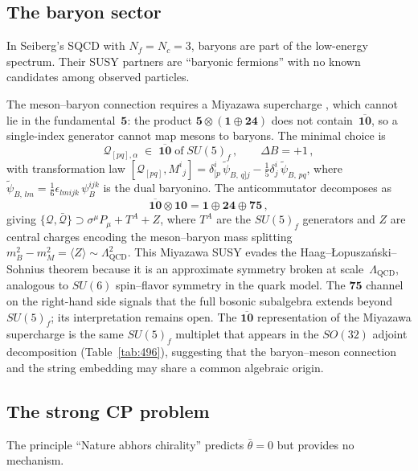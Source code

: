 \documentclass[12pt,a4paper]{article}
\begin{document}
\subsection{The baryon sector}
\label{subsec:baryon_open}
In Seiberg's SQCD with $N_f = N_c = 3$, baryons are part of the
low-energy spectrum. Their SUSY partners are ``baryonic fermions''
with no known candidates among observed particles.

The meson--baryon connection requires a Miyazawa supercharge
\cite{Miyazawa, CattoGursey}, which cannot lie in the
fundamental~$\mathbf{5}$: the product
$\mathbf{5}\otimes(\mathbf{1}\oplus\mathbf{24})$ does not
contain~$\overline{\mathbf{10}}$, so a single-index generator
cannot map mesons to baryons.  The minimal choice is
\begin{equation*}
\mathcal{Q}_{[pq],\alpha}
  \;\in\; \overline{\mathbf{10}}\;\text{of}\;SU(5)_f\,,
  \qquad \Delta B = +1\,,
\end{equation*}
with transformation law
$[\mathcal{Q}_{[pq]}, M^i{}_j]
  = \delta^i_{[p}\,\tilde\psi_{B,\,q]j}
  - \tfrac{1}{5}\delta^i_j\,\tilde\psi_{B,\,pq}$,
where $\tilde\psi_{B,\,lm}
  = \tfrac{1}{6}\epsilon_{lmijk}\,\psi_B^{ijk}$ is the dual
baryonino.  The anticommutator decomposes as
\begin{equation*}
\overline{\mathbf{10}}\otimes\mathbf{10}
  = \mathbf{1}\oplus\mathbf{24}\oplus\mathbf{75}\,,
\end{equation*}
giving $\{\mathcal{Q},\bar{\mathcal{Q}}\}
  \supset \sigma^\mu P_\mu + T^A + Z$, where $T^A$ are the
$SU(5)_f$ generators and $Z$ are central charges encoding the
meson--baryon mass splitting $m_B^2 - m_M^2 = \langle Z\rangle
\sim\Lambda_{\text{QCD}}^2$.  This Miyazawa SUSY evades the
Haag--\L{}opusza\'nski--Sohnius theorem because it is an
approximate symmetry broken at scale~$\Lambda_{\text{QCD}}$,
analogous to $SU(6)$ spin--flavor symmetry in the quark model.
The $\mathbf{75}$ channel on the right-hand side
signals that the full bosonic subalgebra extends beyond
$SU(5)_f$; its interpretation remains open.
The $\overline{\mathbf{10}}$ representation of the Miyazawa
supercharge is the same $SU(5)_f$ multiplet that appears in the
$SO(32)$ adjoint decomposition (Table~\ref{tab:496}), suggesting
that the baryon--meson connection and the string embedding may
share a common algebraic origin.

\subsection{The strong CP problem}
The principle ``Nature abhors chirality'' predicts $\bar{\theta} = 0$ 
but provides no mechanism.
\end{document}
